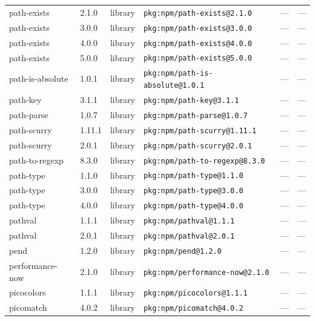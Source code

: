 \documentclass[11pt,a4paper]{article}
\begin{document}
\begin{longtable}{|p{4cm}|p{2cm}|p{1.6cm}|p{5cm}|p{1.5cm}|p{3.5cm}|}
\raggedright path-exists & 2.1.0 & library & \small\texttt{pkg:npm/path-exists@2.1.0} & — & \small — \\
\raggedright path-exists & 3.0.0 & library & \small\texttt{pkg:npm/path-exists@3.0.0} & — & \small — \\
\raggedright path-exists & 4.0.0 & library & \small\texttt{pkg:npm/path-exists@4.0.0} & — & \small — \\
\raggedright path-exists & 5.0.0 & library & \small\texttt{pkg:npm/path-exists@5.0.0} & — & \small — \\
\raggedright path-is-absolute & 1.0.1 & library & \small\texttt{pkg:npm/path-is-absolute@1.0.1} & — & \small — \\
\raggedright path-key & 3.1.1 & library & \small\texttt{pkg:npm/path-key@3.1.1} & — & \small — \\
\raggedright path-parse & 1.0.7 & library & \small\texttt{pkg:npm/path-parse@1.0.7} & — & \small — \\
\raggedright path-scurry & 1.11.1 & library & \small\texttt{pkg:npm/path-scurry@1.11.1} & — & \small — \\
\raggedright path-scurry & 2.0.1 & library & \small\texttt{pkg:npm/path-scurry@2.0.1} & — & \small — \\
\raggedright path-to-regexp & 8.3.0 & library & \small\texttt{pkg:npm/path-to-regexp@8.3.0} & — & \small — \\
\raggedright path-type & 1.1.0 & library & \small\texttt{pkg:npm/path-type@1.1.0} & — & \small — \\
\raggedright path-type & 3.0.0 & library & \small\texttt{pkg:npm/path-type@3.0.0} & — & \small — \\
\raggedright path-type & 4.0.0 & library & \small\texttt{pkg:npm/path-type@4.0.0} & — & \small — \\
\raggedright pathval & 1.1.1 & library & \small\texttt{pkg:npm/pathval@1.1.1} & — & \small — \\
\raggedright pathval & 2.0.1 & library & \small\texttt{pkg:npm/pathval@2.0.1} & — & \small — \\
\raggedright pend & 1.2.0 & library & \small\texttt{pkg:npm/pend@1.2.0} & — & \small — \\
\raggedright performance-now & 2.1.0 & library & \small\texttt{pkg:npm/performance-now@2.1.0} & — & \small — \\
\raggedright picocolors & 1.1.1 & library & \small\texttt{pkg:npm/picocolors@1.1.1} & — & \small — \\
\raggedright picomatch & 4.0.2 & library & \small\texttt{pkg:npm/picomatch@4.0.2} & — & \small — \\

\end{longtable}
\end{document}
